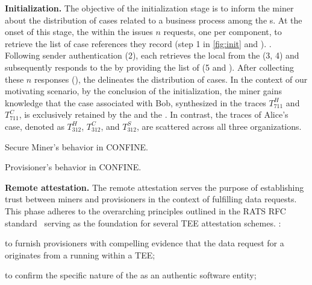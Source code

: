 \noindent\textbf{Initialization.} The objective of the initialization stage is to inform the miner about the distribution of cases related to a business process among the s. At the onset of this stage, the  within the  issues $n$ requests, one per  component, %
to retrieve the list of case references they record (step 1 in \cref{fig:init} and ). . Following sender authentication (2), each  retrieves the local  from the  (3, 4) and subsequently responds to the  by providing the list of  (5 and ). After collecting these $n$ responses (), the  delineates the distribution of cases. In the context of our motivating scenario, by the conclusion of the initialization, the miner gains knowledge that the case associated with Bob, synthesized in the traces $T^H_{711}$ and $T^C_{711}$, is exclusively retained by the  and the . In contrast, the traces of Alice's case, denoted as $T^H_{312}$, $T^C_{312}$, and $T^S_{312}$, are scattered across all three organizations.
\begin{algorithm2e}[tb]
	
	\caption{Secure Miner's behavior in CONFINE.}
	\label{alg:secm}
\end{algorithm2e} 
\begin{algorithm2e}[tb]
	
	\caption{Provisioner's behavior in CONFINE.}
	\label{alg:lprv}
\end{algorithm2e} 
%

\noindent\textbf{Remote attestation.} The remote attestation serves the purpose of establishing trust between miners and provisioners in the context of fulfilling data requests. This phase adheres to the overarching principles outlined in the RATS RFC standard~\citep{rfc9334} serving as the foundation for several TEE attestation schemes. : \begin{inparaenum}
    \item to furnish provisioners with compelling evidence that the data request for a  originates from a  running within a TEE;
    \item to confirm the specific nature of the  as an authentic  software entity;
    \item {}
\end{inparaenum}

